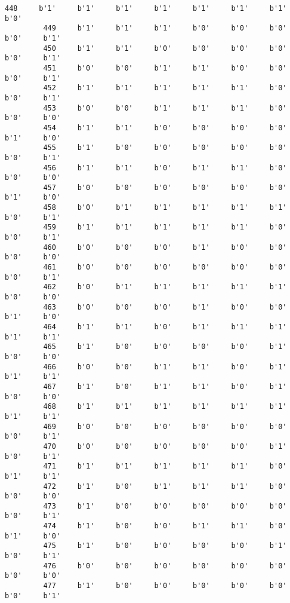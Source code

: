 \documentclass[11pt]{article}
\begin{document}
\begin{Verbatim}[commandchars=\\\{\}]
         448     b'1'     b'1'     b'1'     b'1'     b'1'     b'1'     b'1'     b'0'   
         449     b'1'     b'1'     b'1'     b'0'     b'0'     b'0'     b'0'     b'1'   
         450     b'1'     b'1'     b'0'     b'0'     b'0'     b'0'     b'0'     b'1'   
         451     b'0'     b'0'     b'1'     b'1'     b'0'     b'0'     b'0'     b'1'   
         452     b'1'     b'1'     b'1'     b'1'     b'1'     b'0'     b'0'     b'1'   
         453     b'0'     b'0'     b'1'     b'1'     b'1'     b'0'     b'0'     b'0'   
         454     b'1'     b'1'     b'0'     b'0'     b'0'     b'0'     b'1'     b'0'   
         455     b'1'     b'0'     b'0'     b'0'     b'0'     b'0'     b'0'     b'1'   
         456     b'1'     b'1'     b'0'     b'1'     b'1'     b'0'     b'0'     b'0'   
         457     b'0'     b'0'     b'0'     b'0'     b'0'     b'0'     b'1'     b'0'   
         458     b'0'     b'1'     b'1'     b'1'     b'1'     b'1'     b'0'     b'1'   
         459     b'1'     b'1'     b'1'     b'1'     b'1'     b'0'     b'0'     b'1'   
         460     b'0'     b'0'     b'0'     b'1'     b'0'     b'0'     b'0'     b'0'   
         461     b'0'     b'0'     b'0'     b'0'     b'0'     b'0'     b'0'     b'1'   
         462     b'0'     b'1'     b'1'     b'1'     b'1'     b'1'     b'0'     b'0'   
         463     b'0'     b'0'     b'0'     b'1'     b'0'     b'0'     b'1'     b'0'   
         464     b'1'     b'1'     b'0'     b'1'     b'1'     b'1'     b'1'     b'1'   
         465     b'1'     b'0'     b'0'     b'0'     b'0'     b'1'     b'0'     b'0'   
         466     b'0'     b'0'     b'1'     b'1'     b'0'     b'1'     b'1'     b'1'   
         467     b'1'     b'0'     b'1'     b'1'     b'0'     b'1'     b'0'     b'0'   
         468     b'1'     b'1'     b'1'     b'1'     b'1'     b'1'     b'1'     b'1'   
         469     b'0'     b'0'     b'0'     b'0'     b'0'     b'0'     b'0'     b'1'   
         470     b'0'     b'0'     b'0'     b'0'     b'0'     b'1'     b'0'     b'1'   
         471     b'1'     b'1'     b'1'     b'1'     b'1'     b'0'     b'1'     b'1'   
         472     b'1'     b'0'     b'1'     b'1'     b'1'     b'0'     b'0'     b'0'   
         473     b'1'     b'0'     b'0'     b'0'     b'0'     b'0'     b'0'     b'1'   
         474     b'1'     b'0'     b'0'     b'1'     b'1'     b'0'     b'1'     b'0'   
         475     b'1'     b'0'     b'0'     b'0'     b'0'     b'1'     b'0'     b'1'   
         476     b'0'     b'0'     b'0'     b'0'     b'0'     b'0'     b'0'     b'0'   
         477     b'1'     b'0'     b'0'     b'0'     b'0'     b'0'     b'0'     b'1'   

\end{Verbatim}
\end{document}
